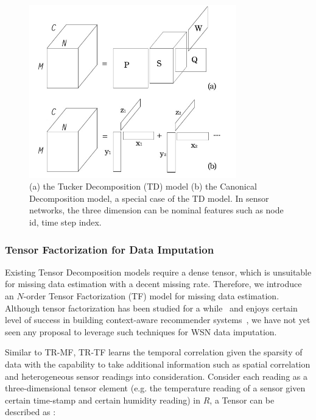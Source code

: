\begin{figure}[h] 
\includegraphics[width=9cm]{tf.jpg} 
\caption{ (a) the Tucker Decomposition (TD) model (b) the Canonical Decomposition model, a special case of the TD model. In sensor networks, the three dimension can be nominal features such as node id, time step index.} 
\label{fig:tf:tuckcanon} 
\end{figure}

\subsubsection{Tensor Factorization for Data Imputation} \label{sec:tfmissing}

Existing Tensor Decomposition models require a dense tensor, which is unsuitable for missing data estimation with a decent missing rate. 
Therefore, we introduce an $N$-order Tensor Factorization (TF) model for missing data estimation. Although tensor factorization has been studied for a while~\cite{tg2009td,bergqvist2010hosvd} and enjoys certain level of success in building context-aware recommender systems~\cite{karatzoglou2010multiverse,steffen2010pairwise,zeno2010context}, we have not yet seen any proposal to leverage such techniques for WSN data imputation.

Similar to TR-MF, TR-TF learns the temporal correlation given the sparsity of data with the capability to take additional information such as spatial correlation and heterogeneous sensor readings into consideration.
Consider each reading as a three-dimensional tensor element (e.g. the temperature reading of a sensor given certain time-stamp and certain humidity reading) in $R$, a Tensor can be described as :

